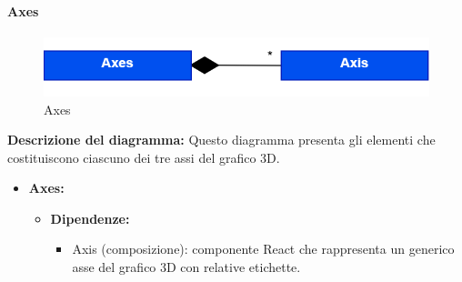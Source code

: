 \paragraph{Axes}
\begin{figure}[h!] \centering
      \includegraphics[scale=0.3]{template/images/uml_front/ui/Axes.png}
      \caption{Axes}
\end{figure}
\textbf{Descrizione del diagramma:}
Questo diagramma presenta gli elementi che costituiscono ciascuno dei tre assi del grafico 3D.
\begin{itemize}
      \item \textbf{Axes:}
            \begin{itemize}
                  \item \textbf{Dipendenze:}
                        \begin{itemize}
                              \item Axis (composizione): componente React che rappresenta un generico asse del
                                    grafico 3D con relative etichette.
                        \end{itemize}
            \end{itemize}
\end{itemize}